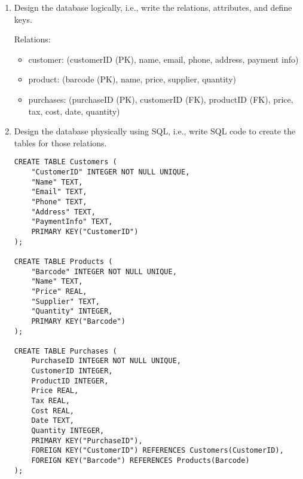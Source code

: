 \documentclass[notitlepage, 11pt]{report}
\begin{document}
\begin{enumerate}[itemindent=-1.5em]
\begin{center}
	\end{center}
	\item Design the database logically, i.e., write the relations, attributes, and define keys.
	
	Relations:
	\begin{itemize}
		\item customer: (customerID (PK), name, email, phone, address, payment info)
		\item product: (barcode (PK), name, price, supplier, quantity)
		\item purchases: (purchaseID (PK), customerID (FK), productID (FK), price, tax, cost, date, quantity)
	\end{itemize}
\newpage
	\item Design the database physically using SQL, i.e., write SQL code to create the tables for those relations.
\Suppressnumber
\begin{lstlisting}
CREATE TABLE Customers (
	"CustomerID" INTEGER NOT NULL UNIQUE,
	"Name" TEXT,
	"Email" TEXT,
	"Phone" TEXT,
	"Address" TEXT,
	"PaymentInfo" TEXT,
	PRIMARY KEY("CustomerID")
);

CREATE TABLE Products (
	"Barcode" INTEGER NOT NULL UNIQUE,
	"Name" TEXT,
	"Price" REAL,
	"Supplier" TEXT,
	"Quantity" INTEGER,
	PRIMARY KEY("Barcode")
);

CREATE TABLE Purchases (
	PurchaseID INTEGER NOT NULL UNIQUE,
	CustomerID INTEGER,
	ProductID INTEGER,
	Price REAL,
	Tax REAL,
	Cost REAL,
	Date TEXT,
	Quantity INTEGER,
	PRIMARY KEY("PurchaseID"),
	FOREIGN KEY("CustomerID") REFERENCES Customers(CustomerID),
	FOREIGN KEY("Barcode") REFERENCES Products(Barcode)
);


\end{lstlisting}
\end{enumerate}
\end{document}
